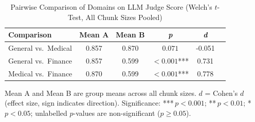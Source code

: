 
\begin{table}[!t]
  \caption{Pairwise Comparison of Domains on LLM Judge Score (Welch's $t$-Test, All Chunk Sizes Pooled)}
  \label{tab:domain_pairwise}
  \centering
  \renewcommand{\arraystretch}{1.2}
  \begin{tabular}{lccccc}
    \hline
    \textbf{Comparison} & \textbf{Mean A} & \textbf{Mean B} & \textbf{\textit{p}} & \textbf{\textit{d}} \\
    \hline
    General vs.\ Medical & 0.857 & 0.870 & $0.071$\phantom{***} & -0.051 \\
    General vs.\ Finance & 0.857 & 0.599 & $<0.001$*** & 0.731 \\
    Medical vs.\ Finance & 0.870 & 0.599 & $<0.001$*** & 0.778 \\
    \hline
  \end{tabular}
  \begin{tablenotes}
    \small
    \item Mean A and Mean B are group means across all chunk sizes.
    $d$ = Cohen's $d$ (effect size, sign indicates direction).
    Significance: ***\,$p < 0.001$; **\,$p < 0.01$; *\,$p < 0.05$;
    unlabelled $p$-values are non-significant ($p \geq 0.05$).
  \end{tablenotes}
\end{table}
